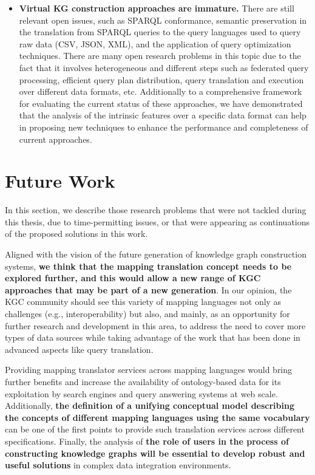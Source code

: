 \begin{itemize}
    \item \textbf{Virtual KG construction approaches are immature.} There are still relevant open issues, such as SPARQL conformance, semantic preservation in the translation from SPARQL queries to the query languages used to query raw data (CSV, JSON, XML), and the application of query optimization techniques. There are many open research problems in this topic due to the fact that it involves heterogeneous and different steps such as federated query processing, efficient query plan distribution, query translation and execution over different data formats, etc. Additionally to a comprehensive framework for evaluating the current status of these approaches, we have demonstrated that the analysis of the intrinsic features over a specific data format can help in proposing new techniques to enhance the performance and completeness of current approaches. 
\end{itemize}


\section{Future Work}
In this section, we describe those research problems that were not tackled during this thesis, due to time-permitting issues, or that were appearing as continuations of the proposed solutions in this work.

Aligned with the vision of the future generation of knowledge graph construction systems, \textbf{we think that the mapping translation concept needs to be explored further, and this would allow a new range of KGC approaches that may be part of a new generation}. In our opinion, the KGC community should see this variety of mapping languages not only as challenges (e.g., interoperability) but also, and mainly, as an opportunity for further research and development in this area, to address the need to cover more types of data sources while taking advantage of the work that has been done in advanced aspects like query translation. 

Providing mapping translator services across mapping languages would bring further benefits and increase the availability of ontology-based data for its exploitation by search engines and query answering systems at web scale. Additionally, \textbf{the definition of a unifying conceptual model describing the concepts of different mapping languages using the same vocabulary} can be one of the first points to provide such translation services across different specifications. Finally, the analysis of \textbf{the role of users in the process of constructing knowledge graphs will be essential to develop robust and useful solutions} in complex data integration environments.

